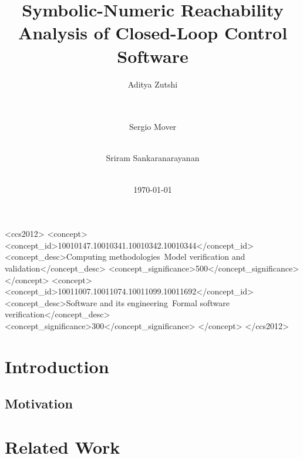 \documentclass{sig-alternate-05-2015}
\title{Symbolic-Numeric Reachability Analysis of Closed-Loop Control Software}
\author{
\alignauthor
Aditya Zutshi\\
\affaddr{\small{University of Colorado, Boulder}}\\
\email{\small{aditya.zutshi@colorado.edu}}\\
    \and
\alignauthor
Sergio Mover\\
\affaddr{\small{University of Colorado, Boulder}}\\
\email{\small{sergio.mover@colorado.edu}}
  \and
\alignauthor
Sriram Sankaranarayanan\\
\affaddr{\small{University of Colorado, Boulder}}\\
\email{\small{srirams@colorado.edu}}
}
\date{\today}
\begin{document}

\maketitle

\begin{abstract}
    
\end{abstract}

%
%
\begin{CCSXML}
<ccs2012>
<concept>
<concept_id>10010147.10010341.10010342.10010344</concept_id>
<concept_desc>Computing methodologies~Model verification and validation</concept_desc>
<concept_significance>500</concept_significance>
</concept>
<concept>
<concept_id>10011007.10011074.10011099.10011692</concept_id>
<concept_desc>Software and its engineering~Formal software verification</concept_desc>
<concept_significance>300</concept_significance>
</concept>
</ccs2012>
\end{CCSXML}


%
%


\newcommand{\RA}[1]{R^{#1}}
\newcommand{\Map}[1]{f_{#1}}

\section{Introduction}
\label{sec:intro}


\subsection{Motivation}
\label{sec:mot}


\section{Related Work}
\label{sec:rel}

\end{document}
